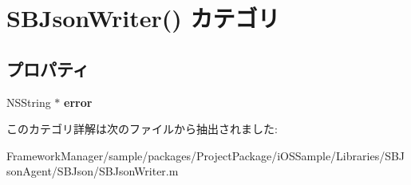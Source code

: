 \hypertarget{category_s_b_json_writer_07_08}{}\section{S\+B\+Json\+Writer() カテゴリ}
\label{category_s_b_json_writer_07_08}
\subsection*{プロパティ}
\begin{DoxyCompactItemize}
\item 
\hypertarget{category_s_b_json_writer_07_08_abe238aca1b2c70d54e166c0a944d8866}{}N\+S\+String $\ast$ {\bfseries error}\label{category_s_b_json_writer_07_08_abe238aca1b2c70d54e166c0a944d8866}

\end{DoxyCompactItemize}


このカテゴリ詳解は次のファイルから抽出されました\+:\begin{DoxyCompactItemize}
\item 
Framework\+Manager/sample/packages/\+Project\+Package/i\+O\+S\+Sample/\+Libraries/\+S\+B\+Json\+Agent/\+S\+B\+Json/S\+B\+Json\+Writer.\+m\end{DoxyCompactItemize}
